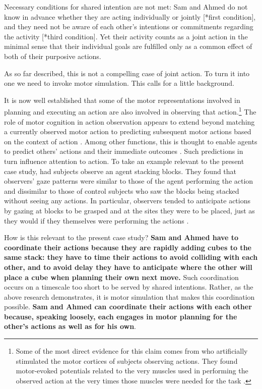 \documentclass[12pt,a4paper]{extarticle}
\begin{document}
Necessary conditions for shared intention are not met: Sam and Ahmed do not know in advance whether they are acting individually or jointly [*first condition], and they need not be aware of each other's intentions or commitments regarding the activity [*third condition].  Yet their activity counts as a joint action in the minimal sense that their individual goals are fulfilled only as a common effect of both of their purposive actions.  

As so far described, this is not a compelling case of joint action.  To turn it into one we need to invoke motor simulation.  This calls for a little background.

It is now well established that some of the motor representations involved in planning and executing an action are also involved in observing that action.\footnote{
Some of the most direct evidence for this claim comes from \citet{Gangitano:2001ft} who artificially stimulated the motor cortices of subjects observing actions.  They found motor-evoked potentials related to the very muscles used in performing the observed action at the very times those muscles were needed for the task \citep[see further][]{Fadiga:2005gq}.  
}
The role of motor cognition in action observation appears to extend beyond matching a currently observed motor action to predicting subsequent motor actions based on the context of action \citep[e.g.][]{Iacoboni:2005ww,hamilton_action_2008}.  Among other functions, this is thought to enable agents to predict others' actions and their immediate outcomes \citep{Wolpert:2003mg,Wilson:2005qu}.  Such predictions in turn influence attention to action.  To take an example relevant to the present case study, \citet{Flanagan:2003lm} had subjects observe an agent stacking blocks.  They found that observers' gaze patterns were similar to those of the agent performing the action and dissimilar to those of control subjects who saw the blocks being stacked without seeing any actions.  In particular, observers tended to anticipate actions by gazing at blocks to be grasped and at the sites they were to be placed, just as they would if they themselves were performing the actions \citep[see further][]{Rotman:2006xf}.  

How is this relevant to the present case study?  \textbf{Sam and Ahmed have to coordinate their actions because they are rapidly adding cubes to the same stack: they have to time their actions to avoid colliding with each other, and to avoid delay they have to anticipate where the other will place a cube when planning their own next move.}  Such coordination occurs on a timescale too short to be served by shared intentions.  Rather, as the above research demonstrates, it is motor simulation that makes this coordination possible.  \textbf{Sam and Ahmed can coordinate their actions with each other because, speaking loosely, each engages in motor planning for the other's actions as well as for his own}.  
\end{document}
